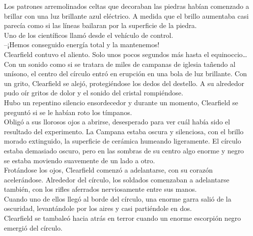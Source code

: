 Los patrones arremolinados celtas que decoraban las piedras habían
comenzado a brillar con una luz brillante azul eléctrico. A medida que
el brillo aumentaba casi parecía como si las líneas bailaran por la
superficie de la piedra.\\
Uno de los científicos llamó desde el vehículo de control.\\
--¡Hemos conseguido energía total y la mantenemos!\\
Clearfield contuvo el aliento. Solo unos pocos segundos más hasta el
equinoccio\ldots{}\\
Con un sonido como si se tratara de miles de campanas de iglesia tañendo
al unísono, el centro del círculo entró en erupción en una bola de luz
brillante. Con un grito, Clearfield se alejó, protegiéndose los dedos
del destello. A su alrededor pudo oír gritos de dolor y el sonido del
cristal rompiéndose.\\
Hubo un repentino silencio ensordecedor y durante un momento, Clearfield
se preguntó si se le habían roto los tímpanos.\\
Obligó a sus llorosos ojos a abrirse, desesperado para ver cuál había
sido el resultado del experimento. La Campana estaba oscura y
silenciosa, con el brillo morado extinguido, la superficie de cerámica
humeando ligeramente. El círculo estaba demasiado oscuro, pero en las
sombras de su centro algo enorme y negro se estaba moviendo suavemente
de un lado a otro.\\
Frotándose los ojos, Clearfield comenzó a adelantarse, con su corazón
acelerándose. Alrededor del círculo, los soldados comenzaban a
adelantarse también, con los rifles aferrados nerviosamente entre sus
manos.\\
Cuando uno de ellos llegó al borde del círculo, una enorme garra salió
de la oscuridad, levantándole por los aires y casi partiéndole en dos.\\
Clearfield se tambaleó hacia atrás en terror cuando un enorme escorpión
negro emergió del círculo.\\
